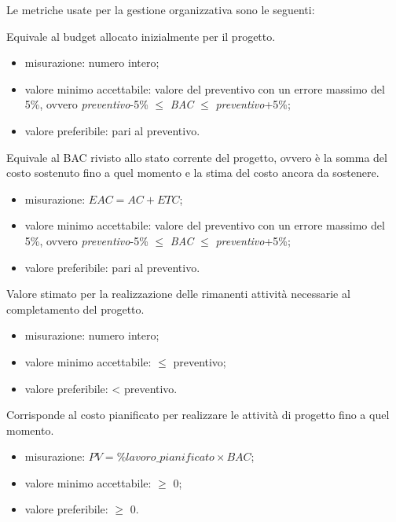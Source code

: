	Le metriche usate per la gestione organizzativa sono le seguenti:
	
		Equivale al budget allocato inizialmente per il progetto.
		\begin{itemize}
			\item{misurazione: numero intero;}
			\item{valore minimo accettabile: valore del preventivo con un errore massimo del 5\%, ovvero \textit{preventivo}-5\% $\leq$ \textit{BAC} $\leq$ \textit{preventivo}+5\%;}
			\item{valore preferibile: pari al preventivo.}
		\end{itemize}
		
		Equivale al BAC rivisto allo stato corrente del progetto, ovvero è la somma del costo sostenuto fino a quel momento e la stima del costo ancora da sostenere.
		\begin{itemize}
			\item{misurazione: $EAC = AC + ETC$;}
			\item{valore minimo accettabile: valore del preventivo con un errore massimo del 5\%, ovvero \textit{preventivo}-5\% $\leq$ \textit{BAC} $\leq$ \textit{preventivo}+5\%;}
			\item{valore preferibile: pari al preventivo.}
		\end{itemize}
		
		Valore stimato per la realizzazione delle rimanenti attività necessarie al completamento del progetto.
		\begin{itemize}
			\item{misurazione: numero intero;}
			\item{valore minimo accettabile: $\leq$ preventivo;}
			\item{valore preferibile: < preventivo.}
		\end{itemize}
		
		Corrisponde al costo pianificato per realizzare le attività di progetto fino a quel momento.
		\begin{itemize}
			\item{misurazione: $PV = \%lavoro\_pianificato \times BAC$;}
			\item{valore minimo accettabile: $\geq$ 0;}
			\item{valore preferibile: $\geq$ 0.}
		\end{itemize}
		
